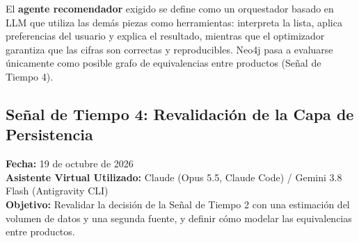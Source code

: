 El \textbf{agente recomendador} exigido se define como un orquestador basado en LLM que utiliza las demás piezas como herramientas: interpreta la lista, aplica preferencias del usuario y explica el resultado, mientras que el optimizador garantiza que las cifras son correctas y reproducibles. Neo4j pasa a evaluarse únicamente como posible grafo de equivalencias entre productos (Señal de Tiempo 4).

\vspace{0.5cm}

\subsection{Señal de Tiempo 4: Revalidación de la Capa de Persistencia}
\textbf{Fecha:} 19 de octubre de 2026 \\
\textbf{Asistente Virtual Utilizado:} Claude (Opus 5.5, Claude Code) / Gemini 3.8 Flash (Antigravity CLI) \\
\textbf{Objetivo:} Revalidar la decisión de la Señal de Tiempo 2 con una estimación del volumen de datos y una segunda fuente, y definir cómo modelar las equivalencias entre productos.


